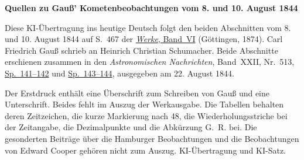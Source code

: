 \clearpage\thispagestyle{empty}
\begin{center}\textbf{Quellen zu Gauß’ Kometenbeobachtungen vom 8. und 10. August 1844}\end{center}
\noindent Diese KI-Übertragung ins heutige Deutsch folgt den beiden Abschnitten vom 8. und 10. August 1844 auf S.~467 der \href{https://gdz.sub.uni-goettingen.de/id/PPN236007467}{\textit{Werke}, Band~VI} (Göttingen, 1874). Carl Friedrich Gauß schrieb an Heinrich Christian Schumacher. Beide Abschnitte erschienen zusammen in den \textit{Astronomischen Nachrichten}, Band~XXII, Nr.~513, \href{https://api.digitale-sammlungen.de/iiif/image/v2/bsb10049447_00079/full/1800,/0/default.jpg}{Sp.~141--142} und \href{https://api.digitale-sammlungen.de/iiif/image/v2/bsb10049447_00080/full/1800,/0/default.jpg}{Sp.~143--144}, ausgegeben am 22. August 1844.
\par\smallskip\noindent Der Erstdruck enthält eine Überschrift zum Schreiben von Gauß und eine Unterschrift. Beides fehlt im Auszug der Werkausgabe. Die Tabellen behalten deren Zeitzeichen, die kurze Markierung nach 48, die Wiederholungsstriche bei der Zeitangabe, die Dezimalpunkte und die Abkürzung G.~R. bei. Die gesonderten Beiträge über die Hamburger Beobachtungen und die Beobachtungen von Edward Cooper gehören nicht zum Auszug. KI-Übertragung und KI-Satz.
\clearpage
